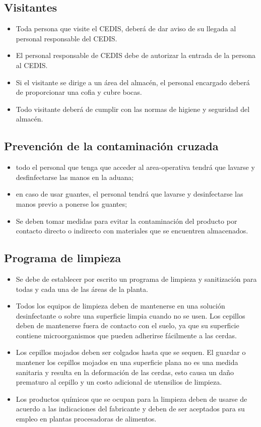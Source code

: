 \subsection{Visitantes}
\begin{itemize}
	\item Toda persona que visite el CEDIS, deberá de dar aviso de su llegada al personal responsable del CEDIS.
	\item El personal responsable de CEDIS debe de autorizar la entrada de la persona al CEDIS.
	\item Si el visitante se dirige a un área del almacén, el personal encargado deberá de proporcionar una cofia y cubre bocas.
	\item Todo visitante deberá de cumplir con las normas de higiene y seguridad del almacén.
\end{itemize}

\subsection{Prevención de la contaminación cruzada}
\begin{itemize}
	\item todo el personal que tenga que acceder al \gls{area-operativa} tendrá que lavarse y desfinfectarse las manos en la \gls{aduana};
	\item en caso de usar guantes, el personal tendrá que lavarse y desinfectarse las manos previo a ponerse los guantes;
	\item Se deben tomar medidas para evitar la contaminación del producto por contacto directo o indirecto con materiales que se encuentren almacenados.
\end{itemize}

\subsection{Programa de limpieza}
\begin{itemize}
	\item Se debe de establecer por escrito un programa de limpieza y sanitización para todas y cada una de las áreas de la planta.
	\item Todos los equipos de limpieza deben de mantenerse en una solución desinfectante o sobre una superficie limpia cuando no se usen. Los cepillos deben de mantenerse fuera de contacto con el suelo, ya que su superficie contiene microorganismos que pueden adherirse fácilmente a las cerdas.
	\item Los cepillos mojados deben ser colgados hasta que se sequen. El guardar o mantener los cepillos mojados en una superficie plana no es una medida sanitaria y resulta en la deformación de las cerdas, esto causa un daño prematuro al cepillo y un costo adicional de utensilios de limpieza.
	\item Los productos químicos que se ocupan para la limpieza deben de usarse de acuerdo a las indicaciones del fabricante y deben de ser aceptados para su empleo en plantas procesadoras de alimentos.
\end{itemize}

